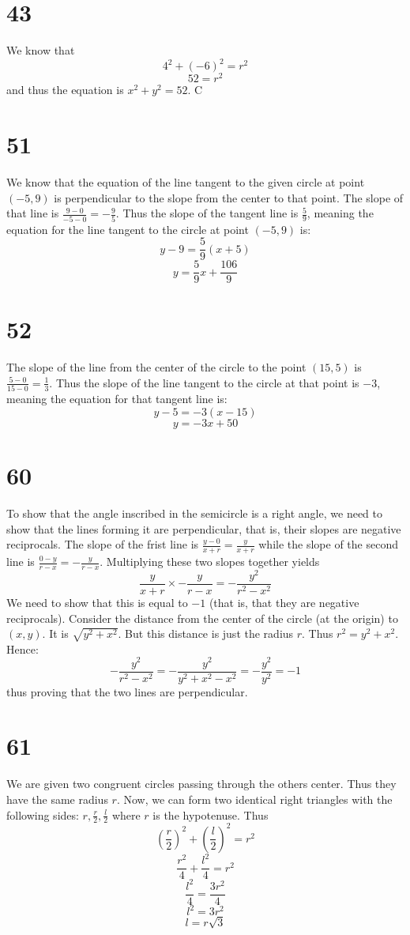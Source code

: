 \documentclass{article}
\theoremstyle{definition}
\newcommand{\?}{\stackrel{?}{=}}
\begin{document}
\section*{43}
We know that \[ 4^2+(-6)^2=r^2 \] \[ 52=r^2 \] and thus the equation is $x^2+y^2=52$. C

\section*{51}
We know that the equation of the line tangent to the given circle at point $(-5,9)$ is perpendicular to the slope from the center to that point. 
The slope of that line is $\frac{9-0}{-5-0}=-\frac{9}{5}$. Thus the slope of the tangent line is $\frac{5}{9}$, meaning the equation for the line tangent to the circle 
at point $(-5,9)$ is:
\[ y-9=\frac{5}{9}(x+5) \]
\[ y=\frac{5}{9}x+\frac{106}{9} \]

\section*{52}
The slope of the line from the center of the circle to the point $(15,5)$ is $\frac{5-0}{15-0}=\frac{1}{3}$. Thus the slope of the line tangent to the circle at 
that point is $-3$, meaning the equation for that tangent line is:
\[ y-5=-3(x-15) \]
\[ y=-3x+50 \]

\section*{60}
To show that the angle inscribed in the semicircle is a right angle, we need to show that the lines forming it are perpendicular, that is, their slopes are negative reciprocals.
The slope of the frist line is $\frac{y-0}{x+r}=\frac{y}{x+r}$ while the slope of the second line is $\frac{0-y}{r-x}=-\frac{y}{r-x}$. Multiplying these two slopes together 
yields \[ \frac{y}{x+r}\times -\frac{y}{r-x}=-\frac{y^2}{r^2-x^2} \] We need to show that this is equal to $-1$ (that is, that they are negative reciprocals). Consider the 
distance from the center of the circle (at the origin) to $(x,y)$. It is $\sqrt{y^2+x^2}$. But this distance is just the radius $r$. Thus 
$r^2=y^2+x^2$. Hence:
\[ -\frac{y^2}{r^2-x^2}=-\frac{y^2}{y^2+x^2-x^2}=-\frac{y^2}{y^2}=-1 \] thus proving that the two lines are perpendicular.

\section*{61}
We are given two congruent circles passing through the others center. Thus they have the same radius $r$. Now, we can form two identical right triangles with the following 
sides: $r,\frac{r}{2},\frac{l}{2}$ where $r$ is the hypotenuse. Thus \[ (\frac{r}{2})^2+(\frac{l}{2})^2=r^2 \]
\[ \frac{r^2}{4}+\frac{l^2}{4}=r^2 \] \[ \frac{l^2}{4}=\frac{3r^2}{4} \] \[ l^2=3r^2 \] \[ l=r\sqrt{3} \]
\end{document}

